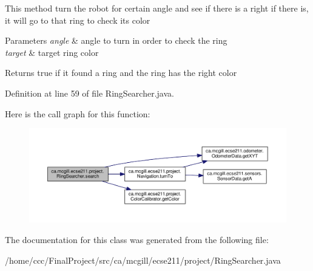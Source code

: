 This method turn the robot for certain angle and see if there is a right if there is, it will go to that ring to check its color


\begin{DoxyParams}{Parameters}
{\em angle} & angle to turn in order to check the ring \\
\hline
{\em target} & target ring color \\
\hline
\end{DoxyParams}
\begin{DoxyReturn}{Returns}
true if it found a ring and the ring has the right color 
\end{DoxyReturn}


Definition at line 59 of file Ring\+Searcher.\+java.

Here is the call graph for this function\+:
\nopagebreak
\begin{figure}[H]
\begin{center}
\leavevmode
\includegraphics[width=350pt]{classca_1_1mcgill_1_1ecse211_1_1project_1_1_ring_searcher_a86d4b320aa7e8368e38c5a38c030adb3_cgraph}
\end{center}
\end{figure}


The documentation for this class was generated from the following file\+:\begin{DoxyCompactItemize}
\item 
/home/ccc/\+Final\+Project/src/ca/mcgill/ecse211/project/Ring\+Searcher.\+java\end{DoxyCompactItemize}

